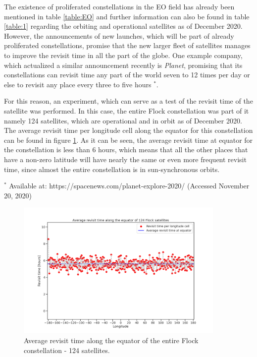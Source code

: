 The existence of proliferated constellations in the EO field has already been mentioned in table \ref{table:EO} and further information can also be found in table \ref{table:1} regarding the orbiting and operational satellites as of December 2020. However, the announcements of new launches, which will be part of already proliferated constellations, promise that the new larger fleet of satellites manages to improve the revisit time in all the part of the globe. One example company, which actualized a similar announcement recently is \textit{Planet}, promising that its constellations can revisit time any part of the world seven to 12 times per day or else to revisit any place every three to five hours $^*$.

For this reason, an experiment, which can serve as a test of the revisit time of the satellite was performed. In this case, the entire Flock constellation was part of it namely 124 satellites, which are operational and in orbit as of December 2020. The average revisit time per longitude cell along the equator for this constellation can be found in figure \ref{revisit_time_hours_of_124_Flocks}. As it can be seen, the average revisit time at equator for the constellation is less than 6 hours, which means that all the other places that have a non-zero latitude will have nearly the same or even more frequent revisit time, since almost the entire constellation is in sun-synchronous orbits. 

\footnotesize{$^*$ {\scriptsize Available at: https://spacenews.com/planet-explore-2020/ (Accessed November 20, 2020)}}
\normalsize

\begin{figure}
\centering
\includegraphics[width=0.9\textwidth]{Images/revisit_time_hours_of_124_Flocks.png}
\caption{Average revisit time along the equator of the entire Flock constellation - 124 satellites.}
\label{revisit_time_hours_of_124_Flocks}
\end{figure}

